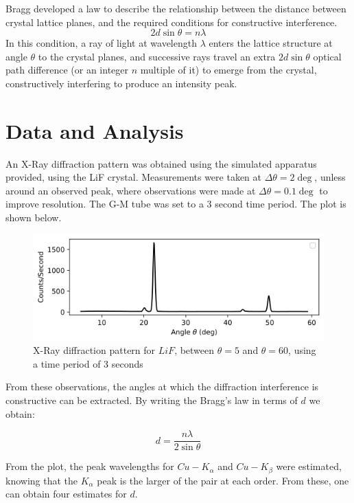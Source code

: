 \documentclass[a4paper]{article}
\begin{document}
Bragg developed a law to describe the relationship between the distance between crystal lattice planes, and the required conditions for constructive interference. 
\begin{equation}
2d\sin\theta=n\lambda
\end{equation}
In this condition, a ray of light at wavelength $\lambda$ enters the lattice structure at angle $\theta$ to the crystal planes, and successive rays travel an extra $2d\sin\theta$ optical path difference (or an integer $n$ multiple of it) to emerge from the crystal, constructively interfering to produce an intensity peak. 

\section{Data and Analysis}

An X-Ray diffraction pattern was obtained using the simulated apparatus provided, using the LiF crystal. Measurements were taken at $\Delta\theta=2\deg$, unless around an observed peak, where observations were made at $\Delta\theta=0.1\deg$ to improve resolution. The G-M tube was set to a 3 second time period. The plot is shown below.

\begin{figure}[h]
\centerline{\includegraphics[scale=0.8]{lif.png}}
\caption{X-Ray diffraction pattern for $LiF$, between $\theta=5$ and $\theta=60$, using a time period of 3 seconds}
\label{fig:lif}
\end{figure}

From these observations, the angles at which the diffraction interference is constructive can be extracted. By writing the Bragg's law in terms of $d$ we obtain:

\begin{equation}
d=\frac{n\lambda}{2\sin\theta}
\end{equation}

From the plot, the peak wavelengths for $Cu-K_\alpha$ and $Cu-K_\beta$ were estimated, knowing that the $K_\alpha$ peak is the larger of the pair at each order. From these, one can obtain four estimates for $d$.
\end{document}

